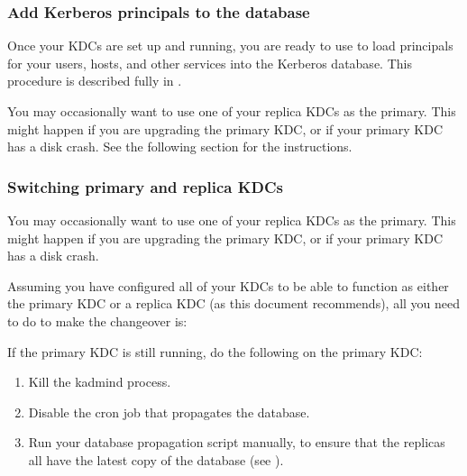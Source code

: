 \documentclass[letterpaper,10pt,english]{sphinxmanual}
\begin{document}
\subsubsection{Add Kerberos principals to the database}
\label{\detokenize{admin/install_kdc:add-kerberos-principals-to-the-database}}
Once your KDCs are set up and running, you are ready to use
{\hyperref[\detokenize{admin/admin_commands/kadmin_local:kadmin-1}]{}} to load principals for your users, hosts, and other
services into the Kerberos database.  This procedure is described
fully in {\hyperref[\detokenize{admin/database:add-mod-del-princs}]{}}.

You may occasionally want to use one of your replica KDCs as the
primary.  This might happen if you are upgrading the primary KDC, or
if your primary KDC has a disk crash.  See the following section for
the instructions.


\subsubsection{Switching primary and replica KDCs}
\label{\detokenize{admin/install_kdc:switch-primary-replica}}\label{\detokenize{admin/install_kdc:switching-primary-and-replica-kdcs}}
You may occasionally want to use one of your replica KDCs as the
primary.  This might happen if you are upgrading the primary KDC, or
if your primary KDC has a disk crash.

Assuming you have configured all of your KDCs to be able to function
as either the primary KDC or a replica KDC (as this document
recommends), all you need to do to make the changeover is:

If the primary KDC is still running, do the following on the 
primary KDC:
\begin{enumerate}
\item {} 
Kill the kadmind process.

\item {} 
Disable the cron job that propagates the database.

\item {} 
Run your database propagation script manually, to ensure that the
replicas all have the latest copy of the database (see
{\hyperref[\detokenize{admin/install_kdc:kprop-to-replicas}]{}}).

\end{enumerate}
\end{document}
